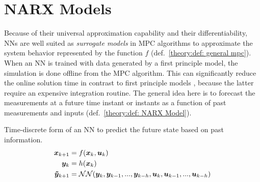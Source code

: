 \section{NARX Models}

Because of their universal approximation capability \cite{hornik1990} and their differentiability, NNs are well suited
as \emph{surrogate models} in MPC algorithms to approximate the system behavior represented by the function $f$ (def.~\ref{theory:def: general mpc}).
When an NN is trained with data generated by a first principle model, the simulation is done offline from the MPC algorithm.
This can significantly reduce the online solution time in contrast to first principle models \cite{salzmann2023}, because
the latter require an expensive integration routine. The general idea here is to forecast the measurements at a future
time instant or instants as a function of past measurements and inputs (def.~\ref{theory:def: NARX Model}).

\begin{definition} Time-discrete form of an NN to predict the future state based on past information.
    \label{theory:def: NARX Model}
    \[
     \begin{aligned}
        {\bm{x}}_{k+1} &= f({\bm{x}}_k, {\bm{u}}_k) \\
        {\bm{y}}_{k} &= h({\bm{x}}_k) \\   
        \bm{\tilde{y}}_{k+1} &= \mathcal{NN}({\bm{y}}_k, {\bm{y}}_{k-1}, ..., {\bm{y}}_{k-h}, {\bm{u}}_k, {\bm{u}}_{k-1}, ..., {\bm{u}}_{k-h})
     \end{aligned}
    \]
\end{definition}

